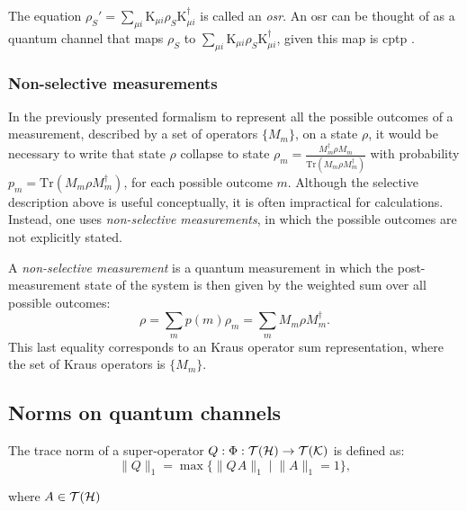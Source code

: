 \begin{definition}
  The equation $ \rho_{S}' = \sum_{\mu i} \text{K}_{\mu i} \rho_{S} \text{K}_{\mu i}^{\dag} $ is called an \emph{\acrfull{osr}}. An \acrshort{osr} can be thought of as a quantum channel that maps $\rho_{S}$ to $\sum_{\mu i} \text{K}_{\mu i} \rho_{S} \text{K}_{\mu i}^{\dag}$, given this map is \acrshort{cptp} \cite{lidar2019lecture, watrous2018theory}. 
\end{definition}




\subsubsection{Non-selective measurements}

In the previously presented formalism to represent all the possible outcomes of a measurement, described by a set of operators $\{M_{m}\}$, on a state $\rho$, it would be necessary to write that state $\rho$ collapse to state $\rho_m=\frac{M_{m}^{\dag}\rho M_{m}}{\text{Tr}(M_{m}\rho M_{m}^{\dag})}$ with probability $p_m=\text{Tr}(M_{m}\rho M_{m}^{\dag})$, for each possible outcome $m$. Although the selective description above is useful conceptually, it is often impractical for calculations. Instead, one uses \emph{non-selective measurements}, in which the possible outcomes are not explicitly stated.


\begin{definition}
A \emph{non-selective measurement} is a quantum measurement in which the post-measurement state of the system is then given by the weighted sum over all possible outcomes:
\[
\rho = \sum_m p(m) \rho_m = \sum_m M_m \rho M_m^{\dag}.
\]
This last equality corresponds to an Kraus operator sum representation, where the set of Kraus operators is $\{M_{m}\}$.
\end{definition}

\subsection{Norms on quantum channels}
\begin{definition} \label{def:trace_norm_superoperator}
  The trace norm of a super-operator $Q:\Phi: \mathcal{T}(\mathcal{H}) \rightarrow \mathcal{T}(\mathcal{K})$ is defined as:
  \begin{equation*} 
    \lVert Q \rVert_{1} =  \max\{\lVert Q \hspace{1pt} A \rVert_{1}   \mid  \lVert A \rVert_{1}=1\}, 
  \end{equation*}
\end{definition}
where $A \in \mathcal{T}(\mathcal{H})$

